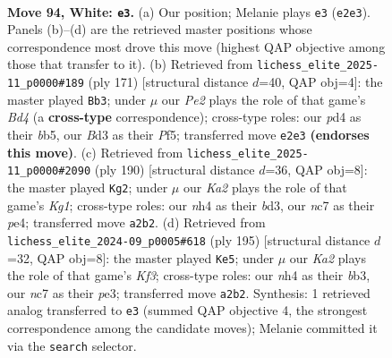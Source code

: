 \documentclass[11pt]{article}
\begin{document}
\clearpage

\begin{figure}[p]\centering
\begin{subfigure}{0.46\textwidth}\centering
\resizebox{\linewidth}{!}{%
\newchessgame
\chessboard[
  setfen={5k2/1Nn5/8/p7/P2pP2n/1P1B4/K2bP2p/8 w - - 4 94},
  showmover=false,
  pgfstyle=straightmove, color=movearrow, markmove={e2-e3}
]}
\caption{}
\end{subfigure}\hfill
\begin{subfigure}{0.46\textwidth}\centering
\resizebox{\linewidth}{!}{%
\newchessgame
\chessboard[
  setfen={8/5k2/6p1/1B1b1p1p/3B3P/6P1/p2K4/8 b - - 85 86},
  showmover=false,
  pgfstyle=straightmove, color=movearrow, markmove={d5-b3}
]}
\caption{}
\end{subfigure}
\\[4pt]
\begin{subfigure}{0.46\textwidth}\centering
\resizebox{\linewidth}{!}{%
\newchessgame
\chessboard[
  setfen={8/8/1B6/P6p/1k2p1p1/3bP1P1/5P2/6K1 w - - 70 96},
  showmover=false,
  pgfstyle=straightmove, color=movearrow, markmove={g1-g2}
]}
\caption{}
\end{subfigure}\hfill
\begin{subfigure}{0.46\textwidth}\centering
\resizebox{\linewidth}{!}{%
\newchessgame
\chessboard[
  setfen={8/8/2K2k1p/p1p3p1/Pb4P1/1B2PP2/8/8 b - - 43 98},
  showmover=false,
  pgfstyle=straightmove, color=movearrow, markmove={f6-e5}
]}
\caption{}
\end{subfigure}
\caption{\textbf{Move 94, White: \texttt{e3}.} (a) Our position; Melanie plays \texttt{e3} (\texttt{e2e3}). Panels (b)--(d) are the retrieved master positions whose correspondence most drove this move (highest QAP objective among those that transfer to it). (b) Retrieved from \texttt{lichess\_elite\_2025-11\_p0000\#189} (ply 171) [structural distance $d$=40, QAP obj=4]: the master played \texttt{Bb3}; under $\mu$ our \emph{Pe2} plays the role of that game's \emph{Bd4} (a \textbf{cross-type} correspondence); cross-type roles: our \emph{p}d4 as their \emph{b}b5, our \emph{B}d3 as their \emph{P}f5; transferred move \texttt{e2e3} \textbf{(endorses this move)}. (c) Retrieved from \texttt{lichess\_elite\_2025-11\_p0000\#2090} (ply 190) [structural distance $d$=36, QAP obj=8]: the master played \texttt{Kg2}; under $\mu$ our \emph{Ka2} plays the role of that game's \emph{Kg1}; cross-type roles: our \emph{n}h4 as their \emph{b}d3, our \emph{n}c7 as their \emph{p}e4; transferred move \texttt{a2b2}. (d) Retrieved from \texttt{lichess\_elite\_2024-09\_p0005\#618} (ply 195) [structural distance $d$=32, QAP obj=8]: the master played \texttt{Ke5}; under $\mu$ our \emph{Ka2} plays the role of that game's \emph{Kf3}; cross-type roles: our \emph{n}h4 as their \emph{b}b3, our \emph{n}c7 as their \emph{p}e3; transferred move \texttt{a2b2}. Synthesis: 1 retrieved analog transferred to \texttt{e3} (summed QAP objective 4, the strongest correspondence among the candidate moves); Melanie committed it via the \texttt{search} selector.}
\label{fig:thought-m186}
\end{figure}
\end{document}
